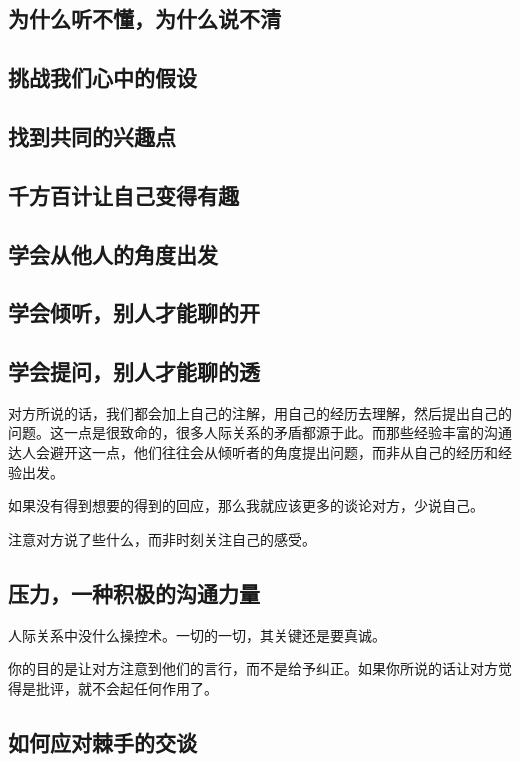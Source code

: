 \documentclass[UTF8,a4paper,8pt]{ctexart}
\begin{document}
	 \subsection{为什么听不懂，为什么说不清}
	 
	 \subsection{挑战我们心中的假设}
	 
	 \subsection{找到共同的兴趣点}
	 
	 \subsection{千方百计让自己变得有趣}
	 
	 \subsection{学会从他人的角度出发}
	 
	 \subsection{学会倾听，别人才能聊的开}
	 
	 \subsection{学会提问，别人才能聊的透}
		 对方所说的话，我们都会加上自己的注解，用自己的经历去理解，然后提出自己的问题。这一点是很致命的，很多人际关系的矛盾都源于此。而那些经验丰富的沟通达人会避开这一点，他们往往会从倾听者的角度提出问题，而非从自己的经历和经验出发。
		 
		 如果没有得到想要的得到的回应，那么我就应该更多的谈论对方，少说自己。
		 
		 注意对方说了些什么，而非时刻关注自己的感受。
	 
	 \subsection{压力，一种积极的沟通力量}
	 
		 人际关系中没什么操控术。一切的一切，其关键还是要真诚。
		 
		 你的目的是让对方注意到他们的言行，而不是给予纠正。如果你所说的话让对方觉得是批评，就不会起任何作用了。
	 \subsection{如何应对棘手的交谈}
	 
\end{document}

